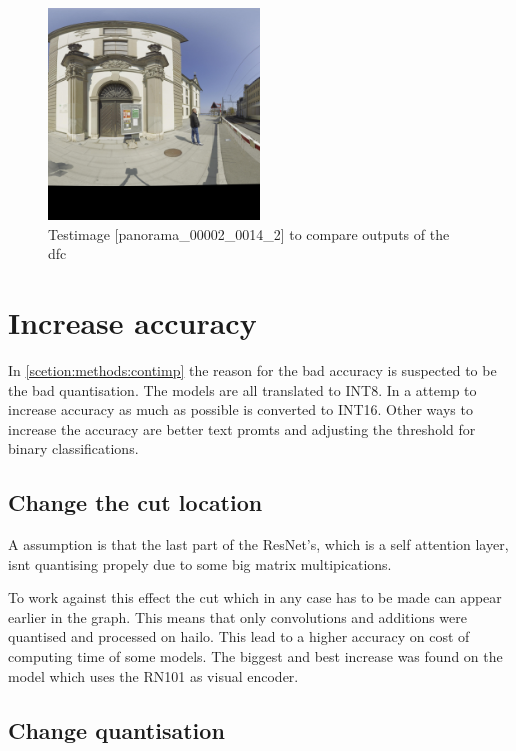 \begin{figure}
    \centering
    \includegraphics[width=0.5\textwidth]{Images/Implementation/panorama_00002_0014_2_testIMg.jpg}
    \caption{Testimage [panorama\_00002\_0014\_2] to compare outputs of the \acrshort{dfc}}
    \label{methods:fig:comparetestpic}
\end{figure}

\section{Increase accuracy}

In \cref{scetion:methods:contimp} the reason for the bad accuracy is suspected to be the bad quantisation.
The models are all translated to INT8.
In a attemp to increase accuracy as much as possible is converted to INT16.
Other ways to increase the accuracy are better text promts and adjusting the threshold for binary classifications.

\subsection{Change the cut location
\label{methods:sec:cutlocation}}
A assumption is that the last part of the ResNet's, which is a self attention layer, isnt quantising propely due to some big matrix multipications.

To work against this effect the cut which in any case has to be made can appear earlier in the graph.
This means that only convolutions and additions were quantised and processed on hailo.
This lead to a higher accuracy on cost of computing time of some models.
The biggest and best increase was found on the model which uses the RN101 as visual encoder.


\subsection{Change quantisation}

